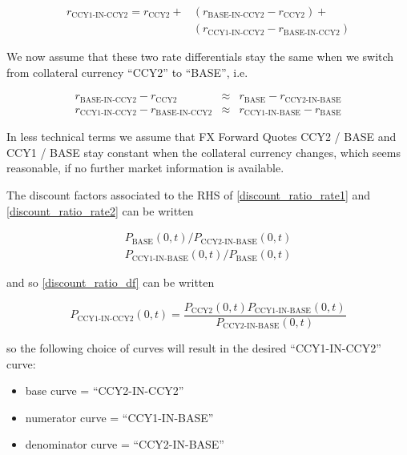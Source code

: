 \begin{equation}\label{discount_ratio_rates}
  \begin{split}
    r_{\text{CCY1-IN-CCY2}} = r_{\text{CCY2}} + & ( r_{\text{BASE-IN-CCY2}} - r_{\text{CCY2}} ) + \\
                               & (r_{\text{CCY1-IN-CCY2}} - r_{\text{BASE-IN-CCY2}})
  \end{split}
\end{equation}

We now assume that these two rate differentials stay the same when we switch from collateral currency ``CCY2'' to
``BASE'', i.e.

\begin{eqnarray}
r_{\text{BASE-IN-CCY2}} - r_{\text{CCY2}} &\approx& r_{\text{BASE}} - r_{\text{CCY2-IN-BASE}} \label{discount_ratio_rate1} \\
r_{\text{CCY1-IN-CCY2}} - r_{\text{BASE-IN-CCY2}} &\approx& r_{\text{CCY1-IN-BASE}} - r_{\text{BASE}}  \label{discount_ratio_rate2}
\end{eqnarray}

In less technical terms we assume that FX Forward Quotes CCY2 / BASE and CCY1 / BASE stay constant when the collateral
currency changes, which seems reasonable, if no further market information is available.

The discount factors associated to the RHS of \ref{discount_ratio_rate1} and \ref{discount_ratio_rate2} can be written

\begin{eqnarray}
  P_{\text{BASE}}(0,t) / P_{\text{CCY2-IN-BASE}}(0,t) \\
  P_{\text{CCY1-IN-BASE}}(0,t) / P_{\text{BASE}}(0,t)
\end{eqnarray}

and so \ref{discount_ratio_df} can be written

\begin{equation}\label{discount_ratio_df2}
  P_{\text{CCY1-IN-CCY2}}(0,t) = \frac{P_{\text{CCY2}}(0,t) P_{\text{CCY1-IN-BASE}}(0,t)}{P_{\text{CCY2-IN-BASE}}(0,t)}
\end{equation}

so the following choice of curves will result in the desired ``CCY1-IN-CCY2'' curve:

\begin{itemize}
\item base curve = ``CCY2-IN-CCY2''
\item numerator curve = ``CCY1-IN-BASE''
\item denominator curve = ``CCY2-IN-BASE''
\end{itemize}

